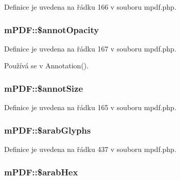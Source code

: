 Definice je uvedena na řádku 166 v souboru mpdf.\-php.

\hypertarget{classm_p_d_f_a2b396b03cfcc7326915d70529b77b82c}{
\subsubsection[{\$annot\-Opacity}]{\setlength{\rightskip}{0pt plus 5cm}m\-P\-D\-F\-::\$annot\-Opacity}}\label{classm_p_d_f_a2b396b03cfcc7326915d70529b77b82c}


Definice je uvedena na řádku 167 v souboru mpdf.\-php.



Používá se v Annotation().

\hypertarget{classm_p_d_f_aeafb91d3b7c79b8dfcc0ce58c0795060}{
\subsubsection[{\$annot\-Size}]{\setlength{\rightskip}{0pt plus 5cm}m\-P\-D\-F\-::\$annot\-Size}}\label{classm_p_d_f_aeafb91d3b7c79b8dfcc0ce58c0795060}


Definice je uvedena na řádku 165 v souboru mpdf.\-php.

\hypertarget{classm_p_d_f_aeb4bd111ea947afe75b64c1543d092f5}{
\subsubsection[{\$arab\-Glyphs}]{\setlength{\rightskip}{0pt plus 5cm}m\-P\-D\-F\-::\$arab\-Glyphs}}\label{classm_p_d_f_aeb4bd111ea947afe75b64c1543d092f5}


Definice je uvedena na řádku 437 v souboru mpdf.\-php.

\hypertarget{classm_p_d_f_aebd16cc247d9cd0a4743e56cb2e5fcde}{
\subsubsection[{\$arab\-Hex}]{\setlength{\rightskip}{0pt plus 5cm}m\-P\-D\-F\-::\$arab\-Hex}}\label{classm_p_d_f_aebd16cc247d9cd0a4743e56cb2e5fcde}


